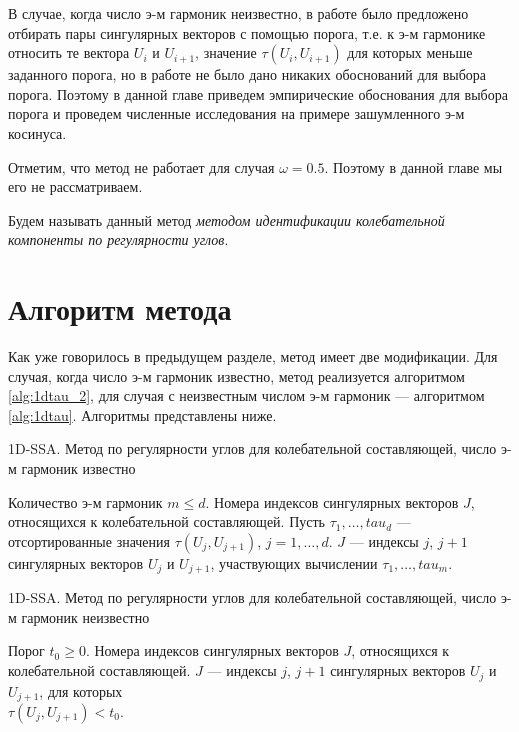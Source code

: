 \documentclass[specialist,
               substylefile = spbu.rtx,
               subf,href,colorlinks=true, 12pt]{disser}
\begin{document}
В случае, когда число
э-м гармоник неизвестно, в работе \cite{Zhornikova2016} было предложено отбирать пары сингулярных векторов с
помощью порога, т.е. к э-м гармонике относить те вектора $U_i$ и $U_{i+1}$, значение  $\tau(U_i, U_{i+1})$ для которых меньше заданного порога, но в работе не было дано никаких обоснований для выбора порога. 
Поэтому в данной главе приведем эмпирические обоснования для выбора порога и проведем численные исследования на примере зашумленного э-м косинуса.    

Отметим, что метод не работает для случая $\omega = 0.5$. Поэтому в данной главе мы его не рассматриваем.

 Будем называть данный метод \textit{методом идентификации колебательной компоненты по регулярности углов}.


\section{Алгоритм метода}
Как уже говорилось в предыдущем разделе, метод имеет две модификации. Для случая, когда число э-м гармоник известно, метод реализуется алгоритмом \ref{alg:1dtau_2}, для случая с неизвестным числом э-м гармоник --- алгоритмом \ref{alg:1dtau}. Алгоритмы представлены ниже.

\begin{algorithm}[!hhh]
\caption{1D-SSA. Метод по регулярности углов для колебательной составляющей, число э-м гармоник известно}
\label{alg:1dtau_2}
\begin{algorithmic}[1]
\REQUIRE Количество э-м гармоник $m \leqslant d$.
\ENSURE Номера индексов сингулярных векторов $J$, относящихся к колебательной составляющей.
\STATE  Пусть $\tau_1, \ldots, tau_d$ --- отсортированные значения $\tau(U_j, U_{j+1})$, $j=1,\ldots, d$.
$J$ --- индексы $j$, $j+1$ сингулярных векторов $U_j$ и $U_{j+1}$, участвующих вычислении $\tau_1, \ldots, tau_m$.
\end{algorithmic}
\end{algorithm}

\begin{algorithm}[!hhh]
\caption{1D-SSA. Метод по регулярности углов для колебательной составляющей, число э-м гармоник неизвестно}
\label{alg:1dtau}
\begin{algorithmic}[1]
\REQUIRE Порог $t_0 \geqslant 0$.
\ENSURE Номера индексов сингулярных векторов $J$, относящихся к колебательной составляющей.
\STATE  $J$ --- индексы $j$, $j+1$ сингулярных векторов $U_j$ и $U_{j+1}$, для которых\\ $\tau(U_j, U_{j+1}) < t_0$.
\end{algorithmic}
\end{algorithm}
\end{document}
